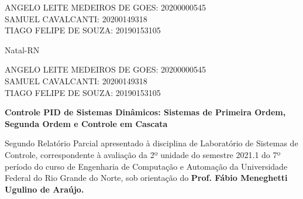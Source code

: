 \documentclass[a4paper,12pt]{article}
\newcommand{\cityandyear}{
\large Natal-RN\\
 \the\year 
 }
\begin{document}
\begin{center}
\vspace{3.0cm}



\begin{flushright}
    \begin{normalsize}
        ANGELO LEITE MEDEIROS DE GOES: 20200000545\\
        \vspace{0.6cm}
        SAMUEL CAVALCANTI: 20200149318\\
        \vspace{0.6cm}
        TIAGO FELIPE DE SOUZA: 20190153105\\
    \end{normalsize}
\end{flushright}


\vspace{3.7cm}

\cityandyear

\end{center}

\newpage


\thispagestyle{empty}

\begin{center}
\begin{normalsize}
ANGELO LEITE MEDEIROS DE GOES: 20200000545\\
\vspace{0.6cm}
SAMUEL CAVALCANTI: 20200149318\\
\vspace{0.6cm}
TIAGO FELIPE DE SOUZA: 20190153105\\
\end{normalsize}
\end{center}
\vspace{4.2cm}

{\bf{\large {\centering Controle PID de Sistemas Dinâmicos: Sistemas de Primeira Ordem, Segunda Ordem e Controle em Cascata\\}}}

\vspace{4cm}

\begin{adjustwidth}{7.5cm}{0cm}

{\normalsize

Segundo Relatório Parcial apresentado à disciplina de
Laboratório de Sistemas de Controle, correspondente à
avaliação da 2º unidade do semestre 2021.1 do 7º período
do curso de Engenharia de Computação e Automação da
Universidade Federal do Rio Grande do Norte, sob
orientação do {\bf Prof. Fábio Meneghetti Ugulino de
Araújo.}

}

\end{adjustwidth}
\end{document}
